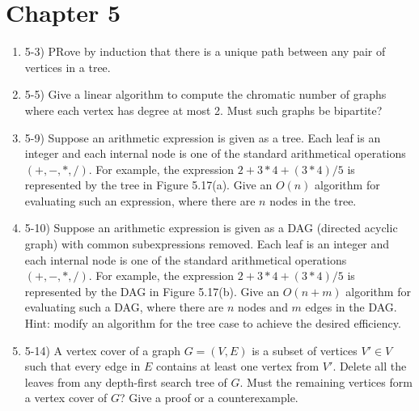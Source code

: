 \documentclass{article}
\begin{document}
\section{Chapter 5}
\begin{enumerate}
    \item 5-3) PRove by induction that there is a unique path between any pair of vertices in a tree.
    
    \item 5-5) Give a linear algorithm to compute the chromatic number of graphs where each vertex has degree at most 2. Must such graphs be bipartite?
    
    \item 5-9) Suppose an arithmetic expression is given as a tree. Each leaf is an integer and each internal node is one of the standard arithmetical operations $(+, -, *, /)$. For example, the expression $2 + 3 * 4 + (3 * 4)/5$ is represented by the tree in Figure 5.17(a). Give an $O(n)$ algorithm for evaluating such an expression, where there are $n$ nodes in the tree.
    
    \item 5-10) Suppose an arithmetic expression is given as a DAG (directed acyclic graph) with common subexpressions removed. Each leaf is an integer and each internal node is one of the standard arithmetical operations $(+, -, *, /)$. For example, the expression $2 + 3 * 4 + (3 * 4)/5$ is represented by the DAG in Figure 5.17(b). Give an $O(n + m)$ algorithm for evaluating such a DAG, where there are $n$ nodes and $m$ edges in the DAG. Hint: modify an algorithm for the tree case to achieve the desired efficiency.
    
    \item 5-14) A vertex cover of a graph $G = (V,E)$ is a subset of vertices $V' \in V$ such that every edge in $E$ contains at least one vertex from $V'$. Delete all the leaves from any depth-first search tree of $G$. Must the remaining vertices form a vertex cover of $G$? Give a proof or a counterexample.

\end{enumerate}
\end{document}

